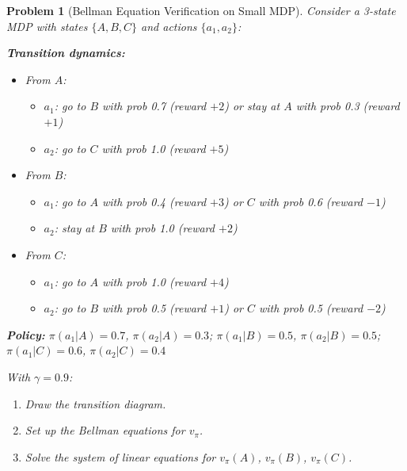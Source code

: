 \documentclass[11pt]{article}
\newtheorem{problem}{Problem}
\theoremstyle{definition}
\begin{document}
\begin{problem}[Bellman Equation Verification on Small MDP]
Consider a 3-state MDP with states $\{A, B, C\}$ and actions $\{a_1, a_2\}$:

\textbf{Transition dynamics:}
\begin{itemize}
    \item From $A$:
    \begin{itemize}
        \item $a_1$: go to $B$ with prob 0.7 (reward $+2$) or stay at $A$ with prob 0.3 (reward $+1$)
        \item $a_2$: go to $C$ with prob 1.0 (reward $+5$)
    \end{itemize}
    \item From $B$:
    \begin{itemize}
        \item $a_1$: go to $A$ with prob 0.4 (reward $+3$) or $C$ with prob 0.6 (reward $-1$)
        \item $a_2$: stay at $B$ with prob 1.0 (reward $+2$)
    \end{itemize}
    \item From $C$:
    \begin{itemize}
        \item $a_1$: go to $A$ with prob 1.0 (reward $+4$)
        \item $a_2$: go to $B$ with prob 0.5 (reward $+1$) or $C$ with prob 0.5 (reward $-2$)
    \end{itemize}
\end{itemize}

\textbf{Policy:} $\pi(a_1|A) = 0.7$, $\pi(a_2|A) = 0.3$; $\pi(a_1|B) = 0.5$, $\pi(a_2|B) = 0.5$; $\pi(a_1|C) = 0.6$, $\pi(a_2|C) = 0.4$

With $\gamma = 0.9$:
\begin{enumerate}[label=(\alph*)]
    \item Draw the transition diagram.
    \item Set up the Bellman equations for $v_\pi$.
    \item Solve the system of linear equations for $v_\pi(A)$, $v_\pi(B)$, $v_\pi(C)$.
\end{enumerate}
\end{problem}

\vfill
\newpage
\end{document}
